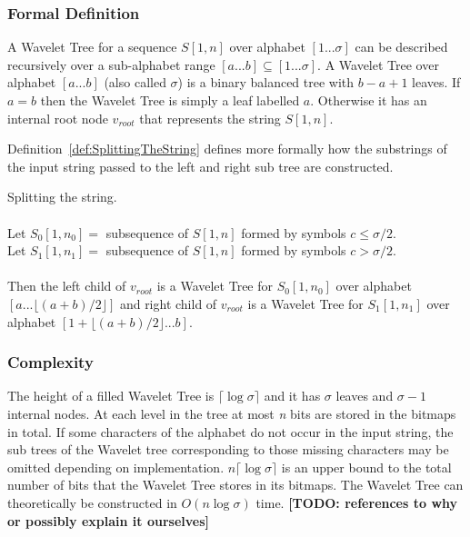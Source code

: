 \subsubsection{Formal Definition}
A Wavelet Tree for a sequence $S[1,n]$ over alphabet $[1 ... \sigma]$ can be described recursively over a sub-alphabet range $[a ... b] \subseteq [1 ... \sigma]$.
A Wavelet Tree over alphabet $[a ... b]$ (also called $\sigma$) is a binary balanced tree with $b - a + 1$ leaves. If $a = b$ then the Wavelet Tree is simply a leaf labelled $a$. 
Otherwise it has an internal root node $v_{root}$ that represents the string $S[1,n]$. 

Definition~\ref{def:SplittingTheString} defines more formally how the substrings of the input string passed to the left and right sub tree are constructed.


\vspace{0.5 cm}
\begin{mdframed}[nobreak, linecolor=lightgray, linewidth=2pt]
\begin{definition} Splitting the string. \\\\
Let $S_0[1,n_0] =$ subsequence of $S[1,n]$ formed by symbols $c \leq \sigma/2$.\\
Let $S_1[1,n_1] =$ subsequence of $S[1,n]$ formed by symbols $c > \sigma/2$.\\\\
Then the left child of $v_{root}$ is a Wavelet Tree for $S_0[1,n_0]$ over alphabet $[a ... \lfloor (a + b)/2 \rfloor]$ and right child of $v_{root}$ is a Wavelet Tree for $S_1[1,n_1]$ over alphabet $[1 + \lfloor (a + b)/2 \rfloor ... b]$.
\label{def:SplittingTheString}
\end{definition}
\end{mdframed}
\vspace{0.5 cm}


\subsubsection{Complexity}
The height of a filled Wavelet Tree is  $\lceil \log \sigma \rceil$ and it has $\sigma$ leaves and $\sigma - 1$ internal nodes. 
At each level in the tree at most \textit{n} bits are stored in the bitmaps in total.
If some characters of the alphabet do not occur in the input string, the sub trees of the Wavelet tree corresponding to those missing characters may be omitted depending on implementation.
$n \lceil \log \sigma \rceil$ is an upper bound to the total number of bits that the Wavelet Tree stores in its bitmaps.
The Wavelet Tree can theoretically be constructed in $O(n \log \sigma)$ time. 
\textbf{[TODO: references to why or possibly explain it ourselves]}\\


